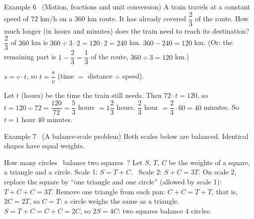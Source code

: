 \begin{exbox}{Example 6 \ (Motion, fractions and unit conversion)}
A train travels at a constant speed of $72$ km/h on a $360$ km route. It has already covered $\dfrac{2}{3}$ of the route.
How much longer (in hours and minutes) does the train need to reach its destination?
\guide
{}
$\dfrac{2}{3}$ of $360$ km is $360\div 3\cdot 2=120\cdot 2=240$ km.
$360-240=120$ km. (Or: the remaining part is $1-\dfrac{2}{3}=\dfrac{1}{3}$ of the route, $360\div 3=120$ km.)
\begin{recallbox}$s=v\cdot t$, so $t=\dfrac{s}{v}$ (time $=$ distance $\div$ speed).\end{recallbox}
Let $t$ (hours) be the time the train still needs. Then $72\cdot t=120$, so
$t=120\div 72=\dfrac{120}{72}=\dfrac{5}{3}$ hours $=1\dfrac{2}{3}$ hours.
$\dfrac{2}{3}$ hour $=\dfrac{2}{3}\cdot 60=40$ minutes. So $t=1$ hour $40$ minutes.
\end{exbox}

\begin{exbox}{Example 7 \ (A balance-scale problem)}
Both scales below are balanced. Identical shapes have equal weights.
\begin{center}
\rvaaScale{\rvaaSq}{\rvaaTri\,\rvaaCir}\hspace{1.2cm}\rvaaScale{\rvaaSq\,\rvaaCir}{\rvaaTri\,\rvaaTri\,\rvaaTri}
\end{center}
How many circles \rvaaCir\ balance two squares \rvaaSq\,\rvaaSq?
\guide
{}
Let $S$, $T$, $C$ be the weights of a square, a triangle and a circle. Scale 1: $S=T+C$. \ Scale 2: $S+C=3T$.
On scale 2, replace the square by ``one triangle and one circle'' (allowed by scale 1):
$T+C+C=3T$.
Remove one triangle from each pan: $C+C=T+T$, that is, $2C=2T$, so $C=T$: a circle weighs the same as a triangle.
$S=T+C=C+C=2C$, so $2S=4C$: two squares balance $4$ circles.
\end{exbox}


